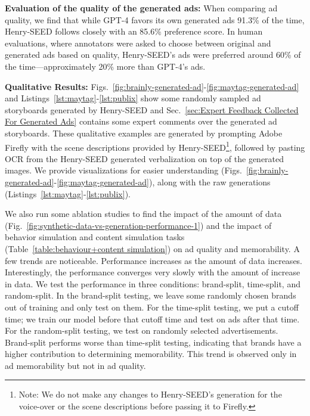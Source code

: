 \textbf{Evaluation of the quality of the generated ads:}
When comparing ad quality, we find that while GPT-4 favors its own generated ads 91.3\% of the time, Henry-SEED follows closely with an 85.6\% preference score. In human evaluations, where annotators were asked to choose between original and generated ads based on quality, Henry-SEED's ads were preferred around 60\% of the time—approximately 20\% more than GPT-4's ads.


\textbf{Qualitative Results:} Figs.~\ref{fig:brainly-generated-ad}-\ref{fig:maytag-generated-ad} and Listings~\ref{lst:maytag}-\ref{lst:publix} show some randomly sampled ad storyboards generated by Henry-SEED and Sec.~\ref{sec:Expert Feedback Collected For Generated Ads} contains some expert comments over the generated ad storyboards. These qualitative examples are generated by prompting Adobe Firefly \cite{adobefirefly} with the scene descriptions provided by Henry-SEED\footnote{Note: We do not make any changes to Henry-SEED's generation for the voice-over or the scene descriptions before passing it to Firefly.}, followed by pasting OCR from the Henry-SEED generated verbalization on top of the generated images. %
We provide visualizations for easier understanding (Figs.~\ref{fig:brainly-generated-ad}-\ref{fig:maytag-generated-ad}), along with the raw generations (Listings~\ref{lst:maytag}-\ref{lst:publix}). 

We also run some ablation studies to find the impact of the amount of data (Fig.~\ref{fig:synthetic-data-vs-generation-performance-1}) and the impact of behavior simulation and content simulation tasks (Table~\ref{table:behaviour+content simulation}) on ad quality and memorability. A few trends are noticeable. Performance increases as the amount of data increases. Interestingly, the performance converges very slowly with the amount of increase in data. We test the performance in three conditions: brand-split, time-split, and random-split. In the brand-split testing, we leave some randomly chosen brands out of training and only test on them. For the time-split testing, we put a cutoff time; we train our model before that cutoff time and test on ads after that time. For the random-split testing, we test on randomly selected advertisements. Brand-split performs worse than time-split testing, indicating that brands have a higher contribution to determining memorability. This trend is observed only in ad memorability but not in ad quality. 

